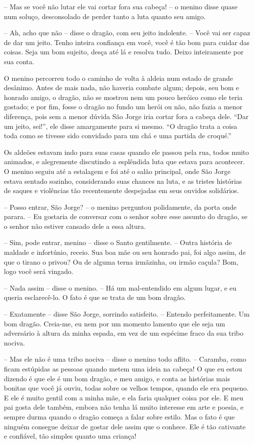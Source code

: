 -- Mas se você não lutar ele vai cortar fora sua cabeça! -- o menino
disse quase num soluço, desconsolado de perder tanto a luta quanto
seu amigo.

-- Ah, acho que não -- disse o dragão, com seu jeito indolente. -- Você
vai ser capaz de dar um jeito. Tenho inteira confiança em você, você
é tão bom para cuidar das coisas. Seja um bom sujeito, desça até lá e
resolva tudo. Deixo inteiramente por sua conta.

O menino percorreu todo o caminho de volta à aldeia num estado de
grande desânimo. Antes de mais nada, não haveria combate algum;
depois, seu bom e honrado amigo, o dragão, não se mostrou nem um
pouco heróico como ele teria gostado; e por fim, fosse o dragão no
fundo um herói ou não, não fazia a menor diferença, pois sem a menor
dúvida São Jorge iria cortar fora a cabeça dele. “Dar um jeito,
sei!”, ele disse amargamente para si mesmo. “O dragão trata a coisa
toda como se tivesse sido convidado para um chá e uma partida de
croqué.”

Os aldeões estavam indo para suas casas quando ele passou pela rua,
todos muito animados, e alegremente discutindo a esplêndida luta que
estava para acontecer. O menino seguiu até a estalagem e foi até o
salão principal, onde São Jorge estava sentado sozinho, considerando
suas chances na luta, e as tristes histórias de saques e violências
tão recentemente despejadas em seus ouvidos solidários.

-- Posso entrar, São Jorge? -- o menino perguntou polidamente, da porta
onde parara. -- Eu gostaria de conversar com o senhor sobre esse
assunto do dragão, se o senhor não estiver cansado dele a essa
altura.

-- Sim, pode entrar, menino -- disse o Santo gentilmente. -- Outra
história de maldade e infortúnio, receio. Sua boa mãe ou seu honrado
pai, foi algo assim, de que o tirano o privou? Ou de alguma terna
irmãzinha, ou irmão caçula? Bom, logo você será vingado.

-- Nada assim -- disse o menino. -- Há um mal-entendido em algum lugar, e
eu queria esclarecê-lo. O fato é que se trata de um bom dragão.

-- Exatamente -- disse São Jorge, sorrindo satisfeito. -- Entendo
perfeitamente. Um bom dragão. Creia-me, eu nem por um momento lamento
que ele seja um adversário à altura da minha espada, em vez de um
espécime fraco da sua tribo nociva.

-- Mas ele não é uma tribo nociva -- disse o menino todo aflito. --
Caramba, como ficam estúpidas as pessoas quando metem uma ideia na
cabeça! O que eu estou dizendo é que ele é um bom dragão, e meu
amigo, e conta as histórias mais bonitas que você já ouviu, todas
sobre os velhos tempos, quando ele era pequeno. E ele é muito gentil
com a minha mãe, e ela faria qualquer coisa por ele. E meu pai gosta
dele também, embora não tenha lá muito interesse em arte e poesia, e
sempre durma quando o dragão começa a falar sobre estilo. Mas o fato
é que ninguém consegue deixar de gostar dele assim que o conhece. Ele
é tão cativante e confiável, tão simples quanto uma criança!

